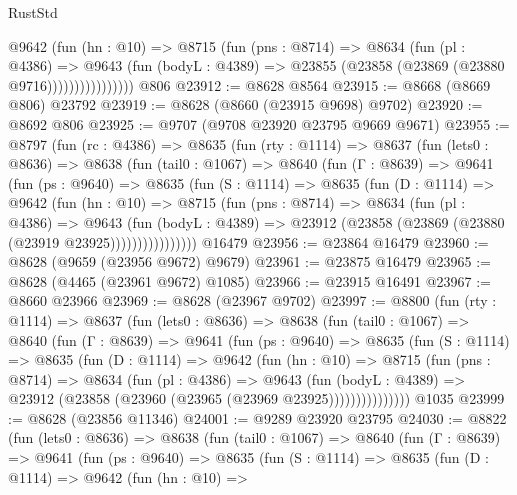 \begin{lexlean}{RustStd}
\begin{coremodule}
                    @9642
                      (fun (hn : @10) =>
                      @8715
                        (fun (pns : @8714) =>
                        @8634
                          (fun (pl : @4386) =>
                          @9643
                            (fun (bodyL : @4389) =>
                            @23855 (@23858 (@23869 (@23880 @9716))))))))))))))))
    @806
@23912 := @8628 @8564
@23915 := @8668 (@8669 @806) @23792
@23919 := @8628 (@8660 (@23915 @9698) @9702)
@23920 := @8692 @806
@23925 := @9707 (@9708 @23920 @23795 @9669 @9671)
@23955 := @8797
    (fun (rc : @4386) =>
    @8635
      (fun (rty : @1114) =>
      @8637
        (fun (lets0 : @8636) =>
        @8638
          (fun (tail0 : @1067) =>
          @8640
            (fun (Γ : @8639) =>
            @9641
              (fun (ps : @9640) =>
              @8635
                (fun (S : @1114) =>
                @8635
                  (fun (D : @1114) =>
                  @9642
                    (fun (hn : @10) =>
                    @8715
                      (fun (pns : @8714) =>
                      @8634
                        (fun (pl : @4386) =>
                        @9643
                          (fun (bodyL : @4389) =>
                          @23912 (@23858 (@23869 (@23880 (@23919 @23925))))))))))))))))
    @16479
@23956 := @23864 @16479
@23960 := @8628 (@9659 (@23956 @9672) @9679)
@23961 := @23875 @16479
@23965 := @8628 (@4465 (@23961 @9672) @1085)
@23966 := @23915 @16491
@23967 := @8660 @23966
@23969 := @8628 (@23967 @9702)
@23997 := @8800
    (fun (rty : @1114) =>
    @8637
      (fun (lets0 : @8636) =>
      @8638
        (fun (tail0 : @1067) =>
        @8640
          (fun (Γ : @8639) =>
          @9641
            (fun (ps : @9640) =>
            @8635
              (fun (S : @1114) =>
              @8635
                (fun (D : @1114) =>
                @9642
                  (fun (hn : @10) =>
                  @8715
                    (fun (pns : @8714) =>
                    @8634
                      (fun (pl : @4386) =>
                      @9643
                        (fun (bodyL : @4389) =>
                        @23912 (@23858 (@23960 (@23965 (@23969 @23925)))))))))))))))
    @1035
@23999 := @8628 (@23856 @11346)
@24001 := @9289 @23920 @23795
@24030 := @8822
    (fun (lets0 : @8636) =>
    @8638
      (fun (tail0 : @1067) =>
      @8640
        (fun (Γ : @8639) =>
        @9641
          (fun (ps : @9640) =>
          @8635
            (fun (S : @1114) =>
            @8635
              (fun (D : @1114) =>
              @9642
                (fun (hn : @10) =>

\end{coremodule}
\end{lexlean}
